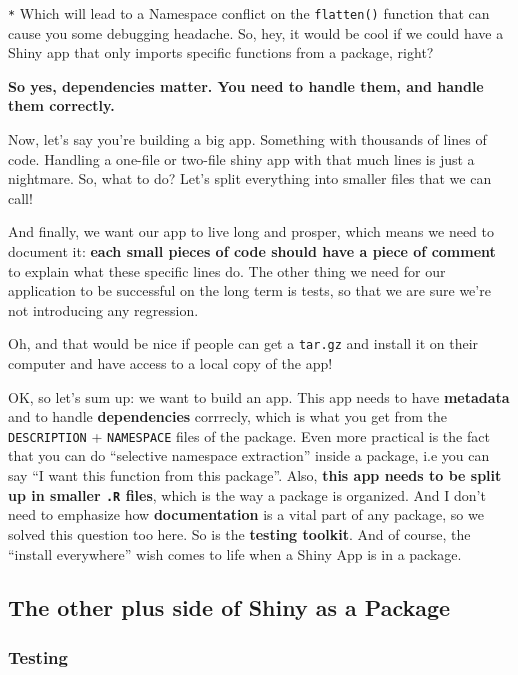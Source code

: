 \documentclass[]{book}
\begin{document}
\texttt{*} Which will lead to a Namespace conflict on the \texttt{flatten()} function that can cause you some debugging headache. So, hey, it would be cool if we could have a Shiny app that only imports specific functions from a package, right?

\textbf{So yes, dependencies matter. You need to handle them, and handle them correctly. }

Now, let's say you're building a big app. Something with thousands of lines of code. Handling a one-file or two-file shiny app with that much lines is just a nightmare. So, what to do? Let's split everything into smaller files that we can call!

And finally, we want our app to live long and prosper, which means we need to document it: \textbf{each small pieces of code should have a piece of comment} to explain what these specific lines do. The other thing we need for our application to be successful on the long term is tests, so that we are sure we're not introducing any regression.

Oh, and that would be nice if people can get a \texttt{tar.gz} and install it on their computer and have access to a local copy of the app!

OK, so let's sum up: we want to build an app. This app needs to have \textbf{metadata} and to handle \textbf{dependencies} corrrecly, which is what you get from the \texttt{DESCRIPTION} + \texttt{NAMESPACE} files of the package. Even more practical is the fact that you can do ``selective namespace extraction'' inside a package, i.e you can say ``I want this function from this package''. Also, \textbf{this app needs to be split up in smaller \texttt{.R} files}, which is the way a package is organized. And I don't need to emphasize how \textbf{documentation} is a vital part of any package, so we solved this question too here. So is the \textbf{testing toolkit}. And of course, the ``install everywhere'' wish comes to life when a Shiny App is in a package.

\hypertarget{the-other-plus-side-of-shiny-as-a-package}{%
\subsection{The other plus side of Shiny as a Package}\label{the-other-plus-side-of-shiny-as-a-package}}

\hypertarget{testing}{%
\subsubsection{Testing}\label{testing}}
\end{document}
